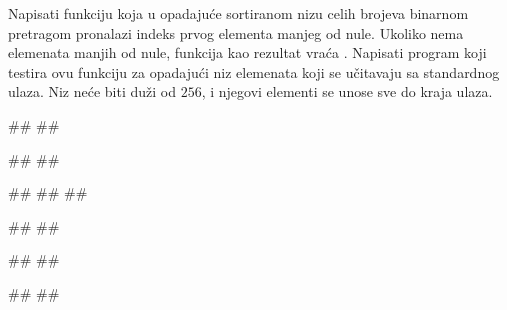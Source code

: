 \begin{Exercise}[label=408]
Napisati funkciju koja u opadajuće sortiranom nizu celih brojeva
binarnom pretragom pronalazi indeks prvog elementa manjeg od
nule. Ukoliko nema elemenata manjih od nule, funkcija kao rezultat
vraća . Napisati program koji testira ovu funkciju za
opadajući niz elemenata koji se učitavaju sa standardnog ulaza. Niz
neće biti duži od $256$, i njegovi elementi se unose sve do kraja
ulaza.

\begin{minitest}
\begin{test}{1}
#\naslovUlaz#
##

#\naslovIzlaz#
##
\end{test}
\end{minitest}
\begin{minitest}
\begin{test}{2}
#\naslovUlaz#
##
##

#\naslovIzlaz#
##
\end{test}
\end{minitest}
\begin{minitest}
\begin{test}{3}
#\naslovUlaz#
##

#\naslovIzlaz#
##
\end{test}
\end{minitest}


\end{Exercise}

